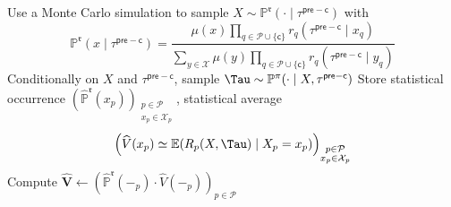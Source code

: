 \documentclass[12pt, a4paper]{article}
\begin{document}
\begin{algorithm}[H]
\caption{$(\widehat{\mathbb P}^{\mathfrak r},\widehat V,\widehat{\mathbf V})\gets$~\texttt{PreTerminalMomentMC}$(\mathfrak r,\tau^{\mathsf{pre-c}})$}
\label{alg:mc-preterminal-moments}
\DontPrintSemicolon
{}
  Use a Monte Carlo simulation to sample $X\sim\mathbb P^{\mathfrak r}(\cdot\mid\tau^{\mathsf{pre-c}})$ with
  \[
    \mathbb P^{\mathfrak r}(x\mid\tau^{\mathsf{pre-c}})
    =
    \frac{\mu(x)\prod_{q\in\mathcal P\cup\{\mathsf c\}}r_q(\tau^{\mathsf{pre-c}}\mid x_q)}
         {\sum_{y\in\mathcal X}\mu(y)\prod_{q\in\mathcal P\cup\{\mathsf c\}}r_q(\tau^{\mathsf{pre-c}}\mid y_q)}
  \]\;
  Conditionally on $X$ and $\tau^{\mathsf{pre-c}}$, sample $\Tau\sim\mathbb P^\pi(\cdot\mid X,\tau^{\mathsf{pre-c}})$\;
  Store statistical occurrence $(\widehat{\mathbb P}^{\mathfrak r}(x_p))_{\substack{p \in \mathcal{P} \\ x_p \in \mathcal{X}_p}}$, statistical average
  \[
    \left(\widehat{V}(x_p) \simeq \mathbb{E}(R_p(X,\Tau) \mid X_p = x_p)\right)_{\substack{p \in \mathcal{P} \\ x_p \in \mathcal{X}_p}}
  \]\;
  Compute $\widehat{\mathbf{V}} \gets \left(\widehat{\mathbb P}^{\mathfrak r}(-_p) \cdot \widehat{V}(-_p)\right)_{p \in \mathcal{P}}$\;
\end{algorithm}
\end{document}
